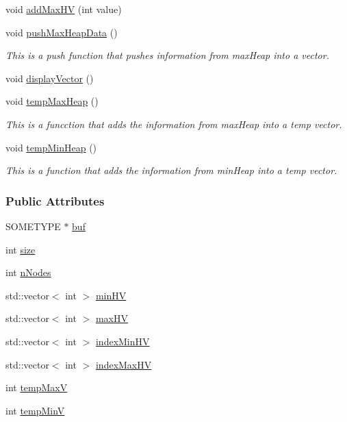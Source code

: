 \begin{DoxyCompactItemize}
void \hyperlink{classHEAP_a935705273d6321f27ff5e73f6a86f220}{add\+Max\+H\+V} (int value)
\item 
void \hyperlink{classHEAP_a49697dff68d8383e2aec0cd757fd4201}{push\+Max\+Heap\+Data} ()
\begin{DoxyCompactList}\small\item\em This is a push function that pushes information from max\+Heap into a vector. \end{DoxyCompactList}\item 
void \hyperlink{classHEAP_a60ee205bf01ba40b2de104f9058e612f}{display\+Vector} ()
\item 
void \hyperlink{classHEAP_a3c1097a2a0b425a08a8da33c2c35edf7}{temp\+Max\+Heap} ()
\begin{DoxyCompactList}\small\item\em This is a funcction that adds the information from max\+Heap into a temp vector. \end{DoxyCompactList}\item 
void \hyperlink{classHEAP_a5985dc9dbed06ce7aa3899b40ab80134}{temp\+Min\+Heap} ()
\begin{DoxyCompactList}\small\item\em This is a function that adds the information from min\+Heap into a temp vector. \end{DoxyCompactList}\end{DoxyCompactItemize}
\subsubsection*{Public Attributes}
\begin{DoxyCompactItemize}
\item 
S\+O\+M\+E\+T\+Y\+P\+E $\ast$ \hyperlink{classHEAP_abe5af2e4e8f2bc55e5b2e70ffa43e630}{buf}
\item 
int \hyperlink{classHEAP_a660f8fd84a9646a631badb8c6ca87aca}{size}
\item 
int \hyperlink{classHEAP_ad481b16366a0a0ff65418afc71d9e652}{n\+Nodes}
\item 
std\+::vector$<$ int $>$ \hyperlink{classHEAP_a541eab0dba5cd90e27be6083b1a1979f}{min\+H\+V}
\item 
std\+::vector$<$ int $>$ \hyperlink{classHEAP_a33776b33a838c2116349c676ac2a7249}{max\+H\+V}
\item 
std\+::vector$<$ int $>$ \hyperlink{classHEAP_adc22726c34c72025819274f63d8bb418}{index\+Min\+H\+V}
\item 
std\+::vector$<$ int $>$ \hyperlink{classHEAP_af6c485575f29a80d91f611af87b7f6b8}{index\+Max\+H\+V}
\item 
int \hyperlink{classHEAP_a82daf731595f82a6224fc9360b63a58d}{temp\+Max\+V}
\item 
int \hyperlink{classHEAP_a0402f157889d6b40f219c608bc9a3503}{temp\+Min\+V}
\end{DoxyCompactItemize}


